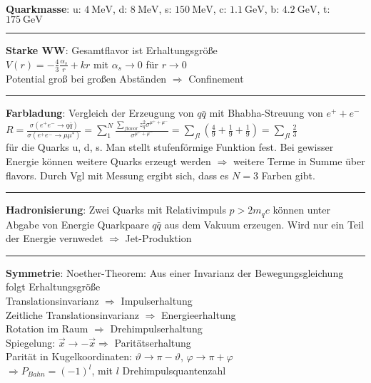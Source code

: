\documentclass[10pt,twoside,a4paper]{article}
\begin{document}
\begin{multicols*}{3}
\ \\
\textbf{Quarkmasse}: u: $\SI{4}{\mega\eV}$, d: $\SI{8}{\mega\eV}$, s: $\SI{150}{\mega\eV}$, c: $\SI{1.1}{\giga\eV}$, b: $\SI{4.2}{\giga\eV}$, t: $\SI{175}{\giga\eV}$
\\ \rule[0ex]{\columnwidth}{0.5pt}
\textbf{Starke WW}: Gesamtflavor ist Erhaltungsgröße \\
$V(r) = - \frac{4}{3} \frac{\alpha_s}{r} + k r$ mit $\alpha_s \to 0$ für $r \to 0$ \\
Potential groß bei großen Abständen $\Rightarrow$ Confinement
\\ \rule[0ex]{\columnwidth}{0.5pt}
\textbf{Farbladung}: Vergleich der Erzeugung von $q\bar{q}$ mit Bhabha-Streuung von $e^+ + e^-$ \\
$R = \frac{\sigma \left( e^+ e^- \to q \bar{q} \right)}{\sigma \left( e^+ e^- \to \mu \mu^* \right)} = \sum_1^N \frac{\sum_{flavor} z^2_q \sigma^{\mu^+ + \mu^-}}{\sigma^{\mu^+ + \mu^-}} = \sum_{fl} \left( \frac{4}{9} + \frac{1}{9} + \frac{1}{9} \right) = \sum_{fl} \frac{2}{3}$ \\
für die Quarks u, d, s. Man stellt stufenförmige Funktion fest. Bei gewisser Energie können weitere Quarks erzeugt werden $\Rightarrow$ weitere Terme in Summe über flavors. Durch Vgl mit Messung ergibt sich, dass es $N=3$ Farben gibt.
\\ \rule[0ex]{\columnwidth}{0.5pt}
\textbf{Hadronisierung}: Zwei Quarks mit Relativimpuls $p > 2 m_q c$ können unter Abgabe von Energie Quarkpaare $q\bar{q}$ aus dem Vakuum erzeugen. Wird nur ein Teil der Energie vernwedet $\Rightarrow$ Jet-Produktion 
\\ \rule[0ex]{\columnwidth}{0.5pt}
\textbf{Symmetrie}: Noether-Theorem: Aus einer Invarianz der Bewegungsgleichung folgt Erhaltungsgröße \\
Translationsinvarianz $\Rightarrow$ Impulserhaltung \\
Zeitliche Translationsinvarianz $\Rightarrow$ Energieerhaltung \\
Rotation im Raum $\Rightarrow$ Drehimpulserhaltung \\
Spiegelung: $\vec{x} \to - \vec{x} \Rightarrow$ Paritätserhaltung \\
Parität in Kugelkoordinaten: $\vartheta \to \pi - \vartheta$, $\varphi \to \pi + \varphi$ \\
$\Rightarrow P_{Bahn} = (-1)^l$, mit $l$ Drehimpulsquantenzahl \\ 

\end{multicols*}
\end{document}
